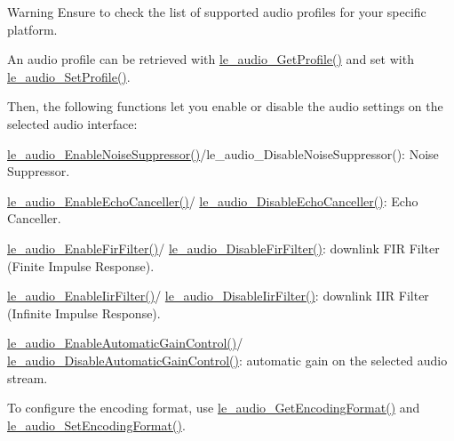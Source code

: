\begin{DoxyWarning}{Warning}
Ensure to check the list of supported audio profiles for your specific platform.
\end{DoxyWarning}
An audio profile can be retrieved with \hyperlink{le__audio__interface_8h_a1bf9091e0068a75a34fdf638ce0f2bc3}{le\+\_\+audio\+\_\+\+Get\+Profile()} and set with \hyperlink{le__audio__interface_8h_ae2e6553f8125a30676d31f5cbd43a3b8}{le\+\_\+audio\+\_\+\+Set\+Profile()}.

Then, the following functions let you enable or disable the audio settings on the selected audio interface\+:
\begin{DoxyItemize}
\item \hyperlink{le__audio__interface_8h_ac1af23c9febed1378620370a6961ce89}{le\+\_\+audio\+\_\+\+Enable\+Noise\+Suppressor()}/le\+\_\+audio\+\_\+\+Disable\+Noise\+Suppressor()\+: Noise Suppressor.
\item \hyperlink{le__audio__interface_8h_a54df27e4ab733a1f50e17903d7a9ae88}{le\+\_\+audio\+\_\+\+Enable\+Echo\+Canceller()}/ \hyperlink{le__audio__interface_8h_afc413a569b1e7eb877a3f98c2b52b05d}{le\+\_\+audio\+\_\+\+Disable\+Echo\+Canceller()}\+: Echo Canceller.
\item \hyperlink{le__audio__interface_8h_adedb3bb7e372fffa406f001bdb353e96}{le\+\_\+audio\+\_\+\+Enable\+Fir\+Filter()}/ \hyperlink{le__audio__interface_8h_ae5be820a7a167c307d64ea2c15b0abb4}{le\+\_\+audio\+\_\+\+Disable\+Fir\+Filter()}\+: downlink F\+I\+R Filter (Finite Impulse Response).
\item \hyperlink{le__audio__interface_8h_ad5eee81a34cc554ddef8a29c64bcd498}{le\+\_\+audio\+\_\+\+Enable\+Iir\+Filter()}/ \hyperlink{le__audio__interface_8h_af7958cd14c83c479ede6ae7a7953461b}{le\+\_\+audio\+\_\+\+Disable\+Iir\+Filter()}\+: downlink I\+I\+R Filter (Infinite Impulse Response).
\item \hyperlink{le__audio__interface_8h_ac4978d8d632269730c67e27d66fba818}{le\+\_\+audio\+\_\+\+Enable\+Automatic\+Gain\+Control()}/ \hyperlink{le__audio__interface_8h_a364cdff3d9fa7b2ced00ef92c0c4e9f7}{le\+\_\+audio\+\_\+\+Disable\+Automatic\+Gain\+Control()}\+: automatic gain on the selected audio stream.
\end{DoxyItemize}

To configure the encoding format, use \hyperlink{le__audio__interface_8h_a62e45a441a7d7ab5b7d20b41849331a2}{le\+\_\+audio\+\_\+\+Get\+Encoding\+Format()} and \hyperlink{le__audio__interface_8h_aead87ec16d317bb4e4a8e7e9ea37550b}{le\+\_\+audio\+\_\+\+Set\+Encoding\+Format()}.

